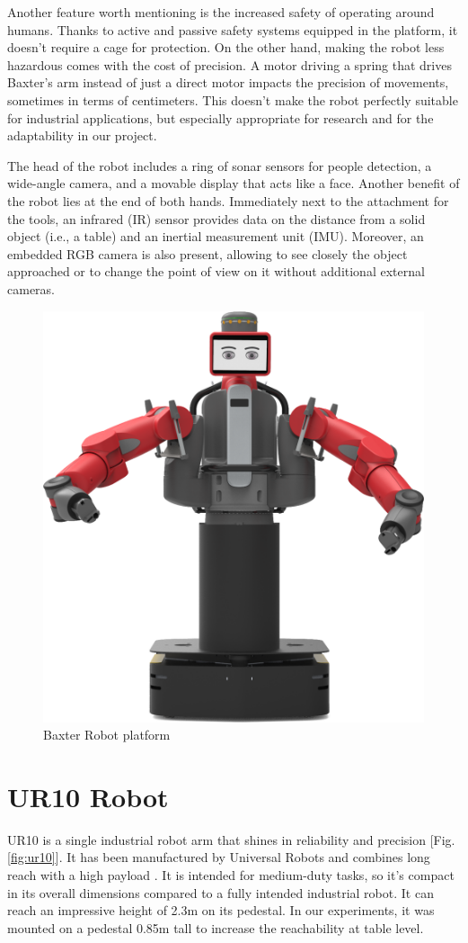 Another feature worth mentioning is the increased safety of operating around humans. Thanks to active and passive safety systems equipped in the platform, it doesn't require a cage for protection. On the other hand, making the robot less hazardous comes with the cost of precision. A motor driving a spring that drives Baxter's arm instead of just a direct motor impacts the precision of movements, sometimes in terms of centimeters. This doesn't make the robot perfectly suitable for industrial applications, but especially appropriate for research and for the adaptability in our project.

The head of the robot includes a ring of sonar sensors for people detection, a wide-angle camera, and a movable display that acts like a face. 
Another benefit of the robot lies at the end of both hands. Immediately next to the attachment for the tools, an infrared (IR) sensor provides data on the distance from a solid object (i.e., a table) and an inertial measurement unit (IMU). Moreover, an embedded RGB camera is also present, allowing to see closely the object approached or to change the point of view on it without additional external cameras.

\begin{figure}
	\centering
	\includegraphics[width=0.5\linewidth]{Images/baxter.png}
	\caption{Baxter Robot platform}
	\label{fig:baxter}
\end{figure}

\section{UR10 Robot}
UR10 is a single industrial robot arm that shines in reliability and precision [Fig. \ref{fig:ur10}]. It has been manufactured by Universal Robots and combines long reach with a high payload \cite{url:ur10}. It is intended for medium-duty tasks, so it's compact in its overall dimensions compared to a fully intended industrial robot. It can reach an impressive height of 2.3m on its pedestal. In our experiments, it was mounted on a pedestal 0.85m tall to increase the reachability at table level. 

